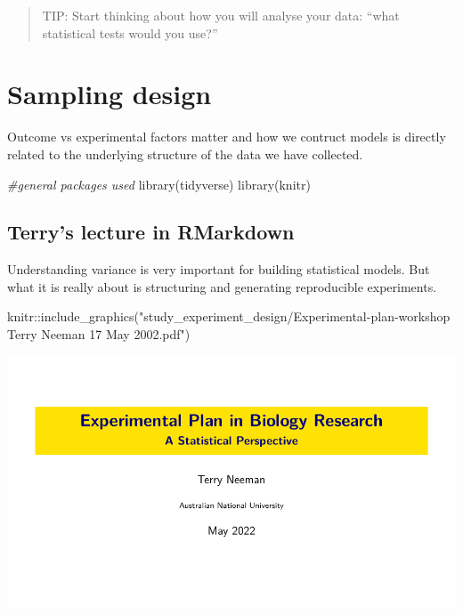 \documentclass[
]{book}
\newenvironment{Shaded}{\begin{snugshade}}{\end{snugshade}}
\newcommand{\CommentTok}[1]{\textcolor[rgb]{0.56,0.35,0.01}{\textit{#1}}}
\newcommand{\FunctionTok}[1]{\textcolor[rgb]{0.00,0.00,0.00}{#1}}
\newcommand{\NormalTok}[1]{#1}
\newcommand{\SpecialCharTok}[1]{\textcolor[rgb]{0.00,0.00,0.00}{#1}}
\newcommand{\StringTok}[1]{\textcolor[rgb]{0.31,0.60,0.02}{#1}}
\begin{document}
\begin{quote}
TIP: Start thinking about how you will analyse your data: ``what statistical tests would you use?''
\end{quote}

\hypertarget{sampling-design}{%
\chapter{Sampling design}\label{sampling-design}}

Outcome vs experimental factors matter and how we contruct models is directly related to the underlying structure of the data we have collected.

\begin{Shaded}
\begin{Highlighting}[]
\CommentTok{\#general packages used}
\FunctionTok{library}\NormalTok{(tidyverse)}
\FunctionTok{library}\NormalTok{(knitr)}
\end{Highlighting}
\end{Shaded}

\hypertarget{terrys-lecture-in-rmarkdown}{%
\section{Terry's lecture in RMarkdown}\label{terrys-lecture-in-rmarkdown}}

Understanding variance is very important for building statistical models. But what it is really about is structuring and generating reproducible experiments.

\begin{Shaded}
\begin{Highlighting}[]
\NormalTok{knitr}\SpecialCharTok{::}\FunctionTok{include\_graphics}\NormalTok{(}\StringTok{"study\_experiment\_design/Experimental{-}plan{-}workshop Terry Neeman 17 May 2002.pdf"}\NormalTok{)}
\end{Highlighting}
\end{Shaded}

\includegraphics{study_experiment_design/Experimental-plan-workshop Terry Neeman 17 May 2002.pdf}
\end{document}
